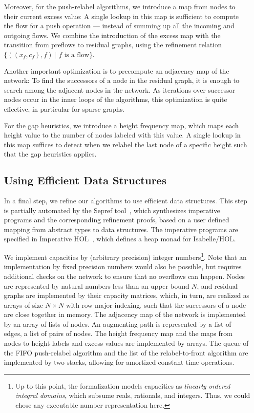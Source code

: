 \documentclass[smallcondensed]{svjour3}     %
\begin{document}
  Moreover, for the push-relabel algorithms, we introduce a map from nodes to their current excess value: 
  A single lookup in this map is sufficient to compute the flow for a push operation --- instead of summing up all 
  the incoming and outgoing flows. We combine the introduction of the excess map with the transition from preflows to residual 
  graphs, using the refinement relation $\{((x_f,c_f),f) \mid \text{$f$ is a flow}\}$.
  
  Another important optimization is to precompute an adjacency map of the network:
  To find the successors of a node in the residual graph, it is enough to search among the adjacent nodes in the network. 
  As iterations over successor nodes occur in the inner loops of the algorithms, this optimization is quite effective, in particular for sparse graphs.

  For the gap heuristics, we introduce a height frequency map, which maps each height value to the number of nodes labeled with this value.
  A single lookup in this map suffices to detect when we relabel the last node of a specific height such that the gap heuristics applies.
  
  
  
  \subsection{Using Efficient Data Structures}\label{sec:impl_data_structures}
  In a final step, we refine our algorithms to use efficient data structures.
  This step is partially automated by the Sepref tool~\cite{La15,La16}, which synthesizes imperative programs and 
  the corresponding refinement proofs, based on a user defined mapping from abstract types to data structures.
  The imperative programs are specified in Imperative HOL~\cite{BKHEM08}, which defines a heap monad for Isabelle/HOL.

  We implement capacities by (arbitrary precision) integer numbers\footnote{Up to this point, the formalization models capacities as \emph{linearly ordered integral domains}, which subsume reals, rationals, and integers. Thus, we could chose any executable number representation here.}. Note that an implementation by fixed precision numbers would also be possible,
  but requires additional checks on the network to ensure that no overflows can happen. 
  Nodes are represented by natural numbers less than an upper bound $N$, and residual graphs are implemented by their capacity matrices, which, in turn,
  are realized as arrays of size $N\times N$ with row-major indexing, such that the successors of a node are close together in memory.
  The adjacency map of the network is implemented by an array of lists of nodes. 
  An augmenting path is represented by a list of edges, \ie a list of pairs of nodes. 
  The height frequency map and the maps from nodes to height labels and excess values are implemented by arrays.
  The queue of the FIFO push-relabel algorithm and the list of the relabel-to-front algorithm are implemented by two stacks, allowing for amortized constant time operations.
\end{document}
